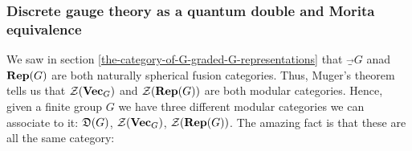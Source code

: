 

\subsubsection{Discrete gauge theory as a quantum double and Morita equivalence}

We saw in section \ref{the-category-of-G-graded-G-representations} that $\Vec_G$ anad ${\bf Rep}(G)$ are both naturally spherical fusion categories. Thus, Muger's theorem tells us that ${\mathcal Z}({\bf Vec}_G)$ and ${\mathcal Z}({\bf Rep}(G))$ are both modular categories. Hence, given a finite group $G$ we have three different modular categories we can associate to it: ${\mathfrak D}(G)$, ${\mathcal Z}({\bf Vec}_G)$, ${\mathcal Z}({\bf Rep}(G))$. The amazing fact is that these are all the same category:

